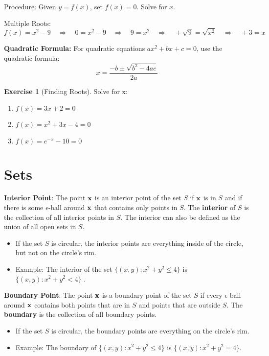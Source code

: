 \documentclass[
]{book}
\providecommand{\tightlist}{%
  \setlength{\itemsep}{0pt}\setlength{\parskip}{0pt}}
\theoremstyle{definition}
\theoremstyle{definition}
\theoremstyle{definition}
\newtheorem{exercise}{Exercise}[chapter]
\theoremstyle{remark}
\begin{document}
Procedure: Given \(y=f(x)\), set \(f(x)=0\). Solve for \(x\).

Multiple Roots:
\[f(x)=x^2 - 9 \quad\Longrightarrow\quad 0=x^2 - 9 \quad\Longrightarrow\quad 9=x^2 \quad\Longrightarrow\quad \pm \sqrt{9}=\sqrt{x^2} \quad\Longrightarrow\quad \pm 3=x\]

\textbf{Quadratic Formula:} For quadratic equations \(ax^2+bx+c=0\), use the quadratic formula: \[x=\frac{-b\pm\sqrt{b^2-4ac}}{2a}\]

\begin{exercise}[Finding Roots]
\protect\hypertarget{exr:solvevar1}{}{\label{exr:solvevar1} {} }
Solve for x:

\begin{enumerate}
\def\labelenumi{\arabic{enumi}.}
\item
  \(f(x)=3x+2 = 0\)
\item
  \(f(x)=x^2+3x-4=0\)
\item
  \(f(x)=e^{-x}-10 = 0\)
\end{enumerate}
\end{exercise}

\hypertarget{sets}{%
\section{Sets}\label{sets}}

\textbf{Interior Point}: The point \(\bf x\) is an interior point of the set \(S\) if \(\bf x\) is in \(S\) and if there is some \(\epsilon\)-ball around \(\bf x\) that contains only points in \(S\). The \textbf{interior} of \(S\) is the collection of all interior points in \(S\). The interior can also be defined as the union of all open sets in \(S\).

\begin{itemize}
\tightlist
\item
  If the set \(S\) is circular, the interior points are everything inside of the circle, but not on the circle's rim.
\item
  Example: The interior of the set \(\{ (x,y) : x^2+y^2\le 4 \}\) is \(\{ (x,y) : x^2+y^2< 4 \}\) .
\end{itemize}

\textbf{Boundary Point}: The point \(\bf x\) is a boundary point of the set \(S\) if every \(\epsilon\)-ball around \(\bf x\) contains both points that are in \(S\) and points that are outside \(S\). The \textbf{boundary} is the collection of all boundary points.

\begin{itemize}
\tightlist
\item
  If the set \(S\) is circular, the boundary points are everything on the circle's rim.
\item
  Example: The boundary of \(\{ (x,y) : x^2+y^2\le 4 \}\) is \(\{ (x,y) : x^2+y^2 = 4 \}\).
\end{itemize}
\end{document}
